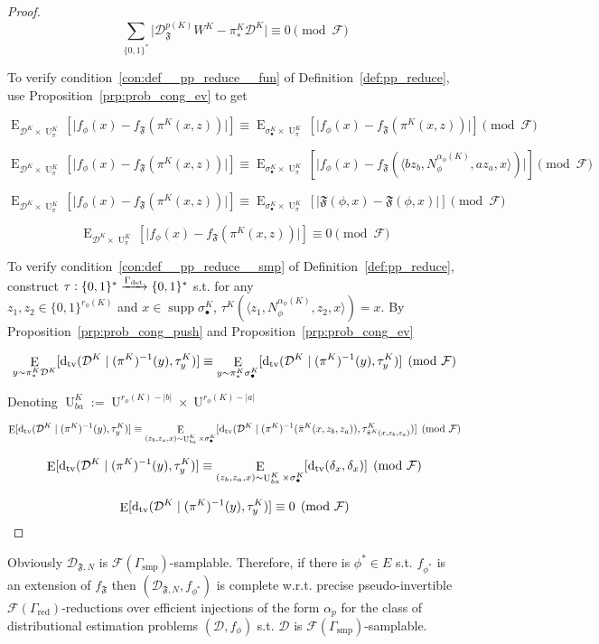\documentclass{article}
\numberwithin{equation}{section}
\theoremstyle{definition}
\theoremstyle{plain}
\newcommand{\Bool}{\{0,1\}}
\newcommand{\Words}{{\Bool^*}}
\DeclareMathOperator{\Supp}{supp}
\DeclareMathOperator{\E}{E}
\DeclareMathOperator{\Un}{U}
\newcommand{\Dtv}{\operatorname{d}_{\textnormal{tv}}}
\newcommand{\Abs}[1]{\lvert #1 \rvert}
\newcommand{\Chev}[1]{\langle #1 \rangle}
\newcommand{\Dist}{\mathcal{D}}
\newcommand{\Fall}{\mathcal{F}}
\begin{document}
\begin{proof}
\[\sum_{\Words} \Abs{\Dist_{\mathfrak{F}}^{p(K)}W^K-\pi_*^K\Dist^K} \equiv 0 \pmod{\Fall}\]

To verify condition~\ref{con:def__pp_reduce__fun} of Definition~\ref{def:pp_reduce}, use Proposition~\ref{prp:prob_cong_ev} to get

\[\E_{\Dist^K \times \Un_\pi^K}[\Abs{f_\phi(x)-f_{\mathfrak{F}}(\pi^K(x,z))}] \equiv \E_{\sigma_\bullet^K \times \Un_\pi^K}[\Abs{f_\phi(x)-f_{\mathfrak{F}}(\pi^K(x,z))}] \pmod{\Fall}\]

\[\E_{\Dist^K \times \Un_\pi^K}[\Abs{f_\phi(x)-f_{\mathfrak{F}}(\pi^K(x,z))}] \equiv \E_{\sigma_\bullet^K \times \Un_\pi^K}[\Abs{f_\phi(x)-f_{\mathfrak{F}}(\Chev{bz_b,N_\phi^{\alpha_\phi(K)},az_a,x})}] \pmod{\Fall}\]

\[\E_{\Dist^K \times \Un_\pi^K}[\Abs{f_\phi(x)-f_{\mathfrak{F}}(\pi^K(x,z))}] \equiv \E_{\sigma_\bullet^K \times \Un_\pi^K}[\Abs{\mathfrak{F}(\phi,x)-\mathfrak{F}(\phi,x)}] \pmod{\Fall}\]

\[\E_{\Dist^K \times \Un_\pi^K}[\Abs{f_\phi(x)-f_{\mathfrak{F}}(\pi^K(x,z))}] \equiv 0 \pmod{\Fall}\]

To verify condition~\ref{con:def__pp_reduce__smp} of Definition~\ref{def:pp_reduce}, construct ${\tau: \Words \xrightarrow{\Gamma_{\textnormal{det}}} \Words}$ s.t. for any\\ $z_1,z_2 \in \Bool^{r_\phi(K)}$ and ${x \in \Supp \sigma_\bullet^K}$, ${\tau^K(\Chev{z_1,N_\phi^{\alpha_\phi(K)},z_2,x})=x}$. By Proposition~\ref{prp:prob_cong_push} and Proposition~\ref{prp:prob_cong_ev}

\[\E_{y \sim \pi_*^K\Dist^K}[\Dtv(\Dist^K \mid (\pi^K)^{-1}(y),\tau_y^K)] \equiv \E_{y \sim \pi_*^K\sigma_\bullet^K}[\Dtv(\Dist^K \mid (\pi^K)^{-1}(y),\tau_y^K)] \pmod{\Fall}\]

Denoting ${\Un_{ba}^K:=\Un^{r_\phi(K)-\Abs{b}} \times \Un^{r_\phi(K)-\Abs{a}}}$

\[\E[\Dtv(\Dist^K \mid (\pi^K)^{-1}(y),\tau_y^K)] \equiv \E_{(z_b,z_a,x) \sim \Un_{ba}^K \times \sigma_\bullet^K}[\Dtv(\Dist^K \mid (\pi^K)^{-1}(\bar{\pi}^K(x,z_b,z_a)),\tau_{\bar{\pi}^K(x,z_b,z_a)}^K)] \pmod{\Fall}\]

\[\E[\Dtv(\Dist^K \mid (\pi^K)^{-1}(y),\tau_y^K)] \equiv \E_{(z_b,z_a,x) \sim \Un_{ba}^K \times \sigma_\bullet^K}[\Dtv(\delta_x,\delta_x)] \pmod{\Fall}\]

\[\E[\Dtv(\Dist^K \mid (\pi^K)^{-1}(y),\tau_y^K)] \equiv 0 \pmod{\Fall}\]
%
\end{proof}

Obviously ${\Dist_{\mathfrak{F},N}}$ is ${\Fall(\Gamma_{\text{smp}})}$-samplable. Therefore, if there is ${\phi^* \in E}$ s.t. ${f_{\phi^*}}$ is an extension of ${f_{\mathfrak{F}}}$ then ${(\Dist_{\mathfrak{F},N},f_{\phi^*})}$ is complete w.r.t. precise pseudo-invertible ${\Fall(\Gamma_{\text{red}})}$-reductions over efficient injections of the form ${\alpha_p}$ for the class of distributional estimation problems ${(\Dist,f_\phi)}$ s.t. ${\Dist}$ is ${\Fall(\Gamma_{\text{smp}})}$-samplable. 
\end{document}
